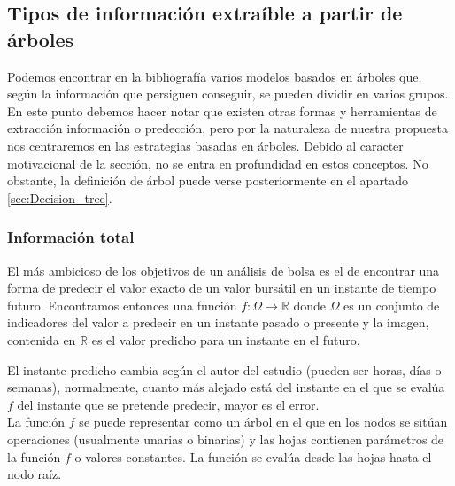 \subsection{Tipos de informaci\'on extra\'ible a partir de \'arboles}
Podemos encontrar en la bibliograf\'ia varios modelos basados en \'arboles que, seg\'un la informaci\'on que persiguen conseguir, se pueden dividir en varios grupos. En este punto debemos hacer notar que existen otras formas y herramientas de extracci\'on informaci\'on o predecci\'on, pero por la naturaleza de nuestra propuesta nos centraremos en las estrategias basadas en \'arboles. Debido al caracter motivacional de la secci\'on, no se entra en profundidad en estos conceptos. No obstante, la definici\'on de \'arbol puede verse posteriormente en el apartado \ref{sec:Decision_tree}.

    \subsubsection{Informaci\'on total}
    
    El m\'as ambicioso de los objetivos de un an\'alisis de bolsa es el de encontrar una forma de predecir el valor exacto de un valor burs\'atil en un instante de tiempo futuro. Encontramos entonces una funci\'on $f:\Omega \rightarrow \mathbb{R}$ donde $\Omega$ es un conjunto de indicadores del valor a predecir en un instante pasado o presente y la imagen, contenida en $\mathbb{R}$ es el valor predicho para un instante en el futuro.
    
    El instante predicho cambia seg\'un el autor del estudio (pueden ser horas, d\'ias o semanas), normalmente, cuanto m\'as alejado est\'a del instante en el que se eval\'ua $f$ del instante que se pretende predecir, mayor es el error.\\
    
    La funci\'on $f$ se puede representar como un \'arbol en el que en los nodos se sit\'uan operaciones (usualmente unarias o binarias) y las hojas contienen par\'ametros de la funci\'on $f$ o valores constantes. La funci\'on se eval\'ua desde las hojas hasta el nodo ra\'iz. \\
    
